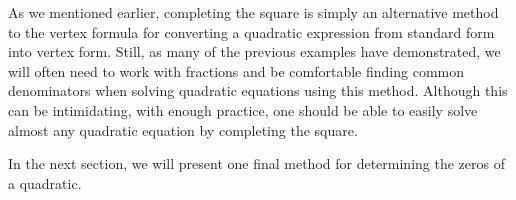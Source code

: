 \documentclass[12pt]{book}
\theoremstyle{definition}
\begin{document}
As we mentioned earlier, completing the square is simply an alternative method to the vertex formula for converting a quadratic expression from standard form into vertex form.  Still, as many of the previous examples have demonstrated, we will often need to work with fractions and be comfortable finding common denominators when solving quadratic equations using this method.  Although this can be intimidating, with enough practice, one should be able to easily solve almost any quadratic equation by completing the square.\par
In the next section, we will present one final method for determining the zeros of a quadratic.
\end{document}
